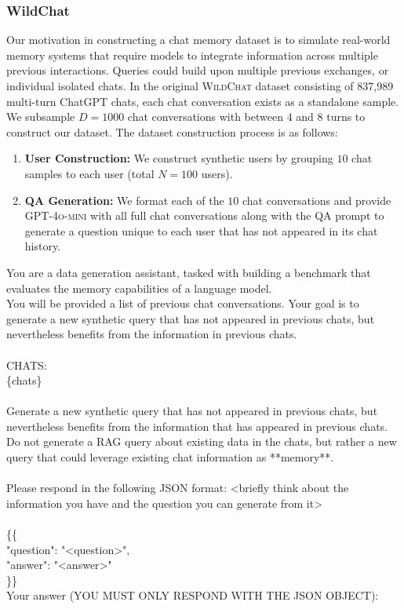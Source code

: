 \documentclass{article} %
\newcommand{\tab}{\hspace*{2em}}
\begin{document}
\subsubsection{WildChat}
\label{sec:appendix-wildchat} 

Our motivation in constructing a chat memory dataset is to simulate real-world memory systems that require models to integrate information across multiple previous interactions. Queries could build upon multiple previous exchanges, or individual isolated chats. In the original \textsc{WildChat} dataset consisting of 837{,}989 multi-turn ChatGPT chats, each chat conversation exists as a standalone sample. We subsample $D=1000$ chat conversations with between $4$ and $8$ turns to construct our dataset. The dataset construction process is as follows:
\begin{enumerate}[leftmargin=*]
    \item \textbf{User Construction:} We construct synthetic users by grouping $10$ chat samples to each user (total $N=100$ users).
    \item \textbf{QA Generation:} We format each of the $10$ chat conversations and provide \textsc{GPT-4o-mini} with all full chat conversations along with the QA prompt to generate a question unique to each user that has not appeared in its chat history. 
\end{enumerate}

\begin{examplebox}
    \ttfamily
You are a data generation assistant, tasked with building a benchmark that evaluates the memory capabilities of a language model. \\
You will be provided a list of previous chat conversations. Your goal is to generate a new synthetic query that has not appeared in previous chats, but nevertheless benefits from the information in previous chats.\\
\\
CHATS:\\
\{chats\} \\
\\
Generate a new synthetic query that has not appeared in previous chats, but nevertheless benefits from the information that has appeared in previous chats. \\
Do not generate a RAG query about existing data in the chats, but rather a new query that could leverage existing chat information as **memory**. \\
\\
Please respond in the following JSON format:
<briefly think about the information you have and the question you can generate from it> \\
\\
\{\{ \\
\tab "question": "<question>", \\
\tab "answer": "<answer>" \\
\}\} \\
Your answer (YOU MUST ONLY RESPOND WITH THE JSON OBJECT):
\end{examplebox}
\end{document}
